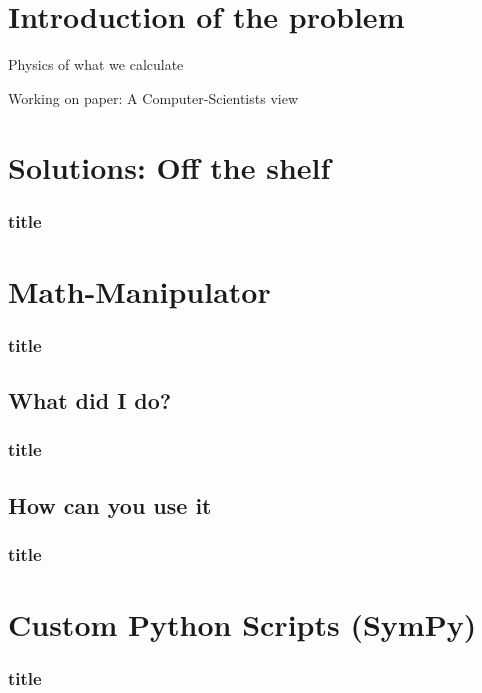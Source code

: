 
\section{Introduction of the problem}
    
    \begin{frame}{Physics of what we calculate}
    \end{frame}

    \begin{frame}{Working on paper: A Computer-Scientists view}
    \end{frame}

\section{Solutions: Off the shelf}
    \begin{frame}
        \frametitle{title}
    \end{frame}

\section{Math-Manipulator}
    \begin{frame}
        \frametitle{title}
    \end{frame}

\subsection{What did I do?}
    \begin{frame}
        \frametitle{title}
    \end{frame}

\subsection{How can you use it}
    \begin{frame}
        \frametitle{title}
    \end{frame}

\section{Custom Python Scripts (SymPy)}
    \begin{frame}
        \frametitle{title}
    \end{frame}